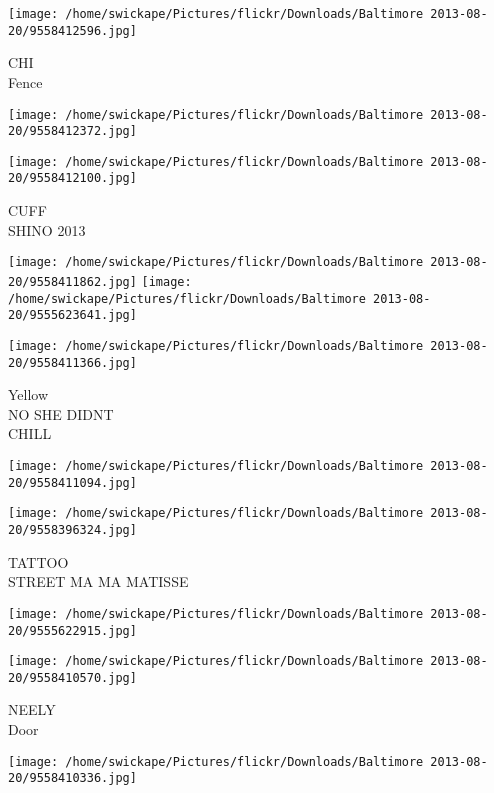\documentclass[10pt,letterpaper]{article}
\begin{document}
\vspace{0.25in}
\texttt{[image: /home/swickape/Pictures/flickr/Downloads/Baltimore 2013-08-20/9558412596.jpg]}

CHI\\
Fence\\
\pagebreak

\texttt{[image: /home/swickape/Pictures/flickr/Downloads/Baltimore 2013-08-20/9558412372.jpg]}

\vspace{0.25in}
\texttt{[image: /home/swickape/Pictures/flickr/Downloads/Baltimore 2013-08-20/9558412100.jpg]}

CUFF\\
SHINO 2013\\
\pagebreak

\texttt{[image: /home/swickape/Pictures/flickr/Downloads/Baltimore 2013-08-20/9558411862.jpg]}
\texttt{[image: /home/swickape/Pictures/flickr/Downloads/Baltimore 2013-08-20/9555623641.jpg]}

\vspace{0.25in}
\texttt{[image: /home/swickape/Pictures/flickr/Downloads/Baltimore 2013-08-20/9558411366.jpg]}

Yellow\\
NO SHE DIDNT\\
CHILL\\
\pagebreak

\texttt{[image: /home/swickape/Pictures/flickr/Downloads/Baltimore 2013-08-20/9558411094.jpg]}

\vspace{0.25in}
\texttt{[image: /home/swickape/Pictures/flickr/Downloads/Baltimore 2013-08-20/9558396324.jpg]}

TATTOO\\
STREET MA MA MATISSE\\
\pagebreak

\texttt{[image: /home/swickape/Pictures/flickr/Downloads/Baltimore 2013-08-20/9555622915.jpg]}

\vspace{0.25in}
\texttt{[image: /home/swickape/Pictures/flickr/Downloads/Baltimore 2013-08-20/9558410570.jpg]}

NEELY\\
Door\\
\pagebreak

\texttt{[image: /home/swickape/Pictures/flickr/Downloads/Baltimore 2013-08-20/9558410336.jpg]}
\end{document}
